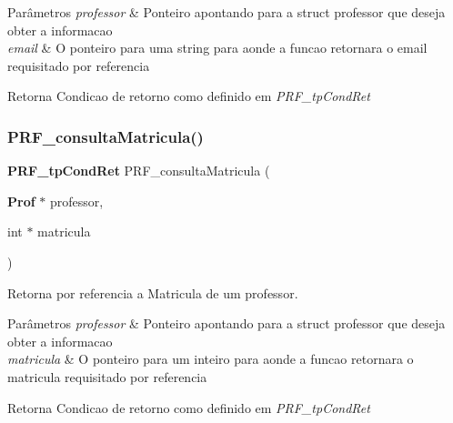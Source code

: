 \begin{DoxyParams}{Parâmetros}
{\em professor} & Ponteiro apontando para a struct professor que deseja obter a informacao \\
\hline
{\em email} & O ponteiro para uma string para aonde a funcao retornara o email requisitado por referencia \\
\hline
\end{DoxyParams}
\begin{DoxyReturn}{Retorna}
Condicao de retorno como definido em {\itshape P\+R\+F\+\_\+tp\+Cond\+Ret} 
\end{DoxyReturn}
\mbox{\label{group__modulo_professor_ga099afc8cbe22cd9570eda47c5d385296}} 
\subsubsection{P\+R\+F\+\_\+consulta\+Matricula()}
{\footnotesize\ttfamily \textbf{ P\+R\+F\+\_\+tp\+Cond\+Ret} P\+R\+F\+\_\+consulta\+Matricula (\begin{DoxyParamCaption}\item[{\textbf{ Prof} $\ast$}]{professor,  }\item[{int $\ast$}]{matricula }\end{DoxyParamCaption})}



Retorna por referencia a Matricula de um professor. 


\begin{DoxyParams}{Parâmetros}
{\em professor} & Ponteiro apontando para a struct professor que deseja obter a informacao \\
\hline
{\em matricula} & O ponteiro para um inteiro para aonde a funcao retornara o matricula requisitado por referencia \\
\hline
\end{DoxyParams}
\begin{DoxyReturn}{Retorna}
Condicao de retorno como definido em {\itshape P\+R\+F\+\_\+tp\+Cond\+Ret} 
\end{DoxyReturn}
\mbox{\label{group__modulo_professor_gac2c49f880ea6cb477bb2695fb7dee346}} 
